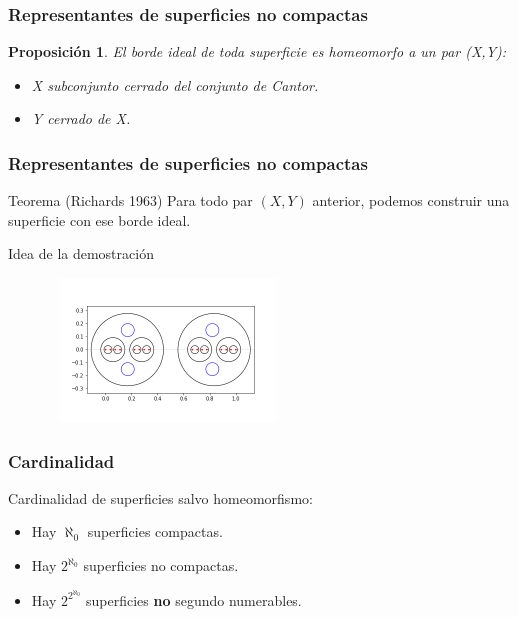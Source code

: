 \documentclass{beamer}
\newtheorem*{prop}{Proposición}
\begin{document}
\begin{frame}
\frametitle{Representantes de superficies no compactas}
\begin{prop}
El borde ideal de toda superficie es homeomorfo a un par (X,Y):
\begin{itemize}
\item X subconjunto cerrado del conjunto de Cantor.
\item Y cerrado de X.
\end{itemize} 
\end{prop}


\end{frame}

\begin{frame}
\frametitle{Representantes de superficies no compactas}

\begin{block}
{Teorema (Richards 1963)}
Para todo par $(X,Y)$ anterior, podemos construir una superficie con ese borde ideal.
\end{block}
\begin{block}
{Idea de la demostración}
\begin{figure}[htb]
\begin{center}
\includegraphics[width=2.5in,height=1.5in]{imagenes/eleccionCK.png} 
\end{center}
\end{figure}


\end{block}
\end{frame}



\begin{frame}
\frametitle{Cardinalidad}
Cardinalidad de superficies salvo homeomorfismo:
\begin{itemize}
\item Hay $\aleph_0$ superficies compactas.
\item Hay $2^{\aleph_0}$ superficies no compactas.
\item  Hay $2^{2^{\aleph_0}}$ superficies \textbf{no} segundo numerables.
\end{itemize}



\end{frame}

 

 
 
 
 
\end{document}
